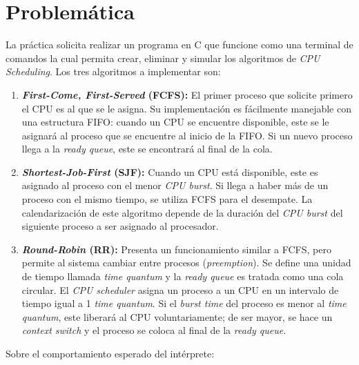 \documentclass[12pt]{article}
\begin{document}
\section{Problemática}
La práctica solicita realizar un programa en C que funcione como una terminal de comandos la cual permita crear, eliminar y simular los algoritmos de \textit{CPU Scheduling}. Los tres algoritmos a implementar son:
    \begin{enumerate}
        \item \textbf{\textit{First-Come, First-Served} (FCFS):} El primer proceso que solicite primero el CPU es al que se le asigna. Su implementación es fácilmente manejable con una estructura FIFO: cuando un CPU se encuentre disponible, este se le asignará al proceso que se encuentre al inicio de la FIFO. Si un nuevo proceso llega a la \textit{ready queue}, este se encontrará al final de la cola.
        \item \textbf{\textit{Shortest-Job-First} (SJF):} Cuando un CPU está disponible, este es asignado al proceso con el menor \textit{CPU burst}. Si llega a haber más de un proceso con el mismo tiempo, se utiliza FCFS para el desempate. La calendarización de este algoritmo depende de la duración del \textit{CPU burst} del siguiente proceso a ser asignado al procesador.
        \item \textbf{\textit{Round-Robin} (RR):} Presenta un funcionamiento similar a FCFS, pero permite al sistema cambiar entre procesos (\textit{preemption}). Se define una unidad de tiempo llamada \textit{time quantum} y la \textit{ready queue} es tratada como una cola circular. El \textit{CPU scheduler} asigna un proceso a un CPU en un intervalo de tiempo igual a 1 \textit{time quantum}. Si el \textit{burst time} del proceso es menor al \textit{time quantum}, este liberará al CPU voluntariamente; de ser mayor, se hace un \textit{context switch} y el proceso se coloca al final de la \textit{ready queue}.
    \end{enumerate}
    Sobre el comportamiento esperado del intérprete:
\end{document}
